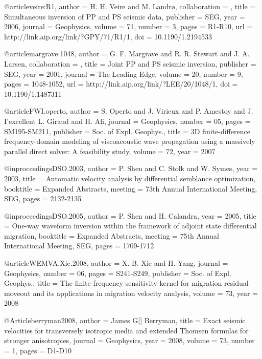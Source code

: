 @article{veire:R1,
author = {H. H. Veire and M. Landr\o},
collaboration = {},
title = {Simultaneous inversion of {PP} and {PS} seismic data},
publisher = {SEG},
year = {2006},
journal = {Geophysics},
volume = {71},
number = {3},
pages = {R1-R10},
url = {http://link.aip.org/link/?GPY/71/R1/1},
doi = {10.1190/1.2194533}
}

@article{margrave:1048,
author = {G. F. Margrave and R. R. Stewart and J. A. Larsen},
collaboration = {},
title = {Joint {PP} and {PS} seismic inversion},
publisher = {SEG},
year = {2001},
journal = {The Leading Edge},
volume = {20},
number = {9},
pages = {1048-1052},
url = {http://link.aip.org/link/?LEE/20/1048/1},
doi = {10.1190/1.1487311}
}







@article{FWI.operto,
  author = { S. Operto and J. Virieux and P. Amestoy and J.
I'excellent L. Giraud and H. Ali},
  journal = {Geophysics},
  number = {05},
  pages = {SM195-SM211},
  publisher = {Soc. of Expl. Geophys.},
  title = { 3{D} finite-difference frequency-domain modeling of
viscoacoustic wave propagation using a massively parallel direct
solver: A feasibility study},
  volume = {72},
  year = {2007}}

@inproceedings{DSO.2003,
  author    = {P. Shen and C. Stolk and W. Symes},
  year      = {2003},
  title     = {Automatic velocity analysis by differential semblance
optimization},
  booktitle = {Expanded Abstracts},
  meeting   = {73th Annual International Meeting, SEG},
  pages     = {2132-2135}
}

@inproceedings{DSO.2005,
  author    = {P. Shen and H. Calandra},
  year      = {2005},
  title     = {One-way waveform inversion within the framework of
adjoint state differential migration},
  booktitle = {Expanded Abstracts},
  meeting   = {75th Annual International Meeting, SEG},
  pages     = {1709-1712}
}

@article{WEMVA.Xie.2008,
  author = { X. B. Xie and H. Yang},
  journal = {Geophysics},
  number = {06},
  pages = {S241-S249},
  publisher = {Soc. of Expl. Geophys.},
  title = {The finite-frequency sensitivity kernel for migration
residual moveout and its applications in migration velocity analysis},
  volume = {73},
  year = {2008}}

%
@Article{berryman2008,
  author = 	 {James G[] Berryman},
  title = 	 {Exact seismic velocities for transversely isotropic media and extended Thomsen formulas for stronger anisotropies},
  journal = 	 {Geophysics},
  year = 	 2008,
  volume = 	 73,
  number = 	 1,
  pages = 	 {D1-D10}}

